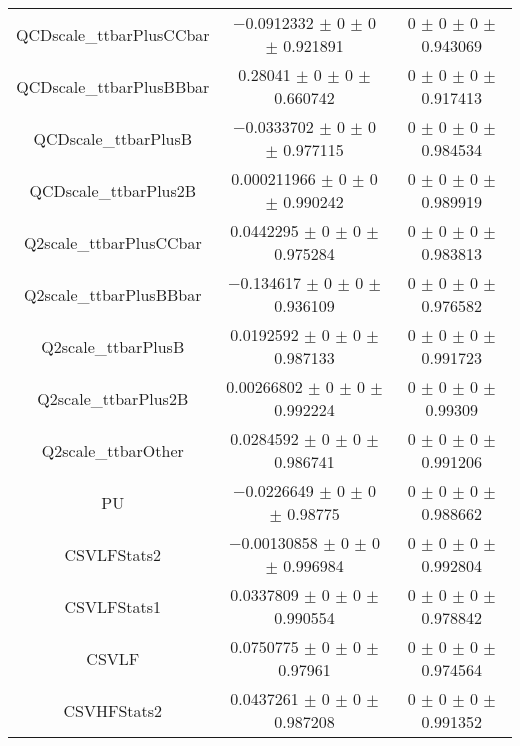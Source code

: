 \begin{table}
\begin{tabular}{ccc}
QCDscale\_ttbarPlusCCbar 	& \num{-0.0912332} $\pm$ \num{0} $\pm$ \num{0} $\pm$ \num{0.921891} 	& \num{0} $\pm$ \num{0} $\pm$ \num{0} $\pm$ \num{0.943069}\\
QCDscale\_ttbarPlusBBbar 	& \num{0.28041} $\pm$ \num{0} $\pm$ \num{0} $\pm$ \num{0.660742} 	& \num{0} $\pm$ \num{0} $\pm$ \num{0} $\pm$ \num{0.917413}\\
QCDscale\_ttbarPlusB 	& \num{-0.0333702} $\pm$ \num{0} $\pm$ \num{0} $\pm$ \num{0.977115} 	& \num{0} $\pm$ \num{0} $\pm$ \num{0} $\pm$ \num{0.984534}\\
QCDscale\_ttbarPlus2B 	& \num{0.000211966} $\pm$ \num{0} $\pm$ \num{0} $\pm$ \num{0.990242} 	& \num{0} $\pm$ \num{0} $\pm$ \num{0} $\pm$ \num{0.989919}\\
Q2scale\_ttbarPlusCCbar 	& \num{0.0442295} $\pm$ \num{0} $\pm$ \num{0} $\pm$ \num{0.975284} 	& \num{0} $\pm$ \num{0} $\pm$ \num{0} $\pm$ \num{0.983813}\\
Q2scale\_ttbarPlusBBbar 	& \num{-0.134617} $\pm$ \num{0} $\pm$ \num{0} $\pm$ \num{0.936109} 	& \num{0} $\pm$ \num{0} $\pm$ \num{0} $\pm$ \num{0.976582}\\
Q2scale\_ttbarPlusB 	& \num{0.0192592} $\pm$ \num{0} $\pm$ \num{0} $\pm$ \num{0.987133} 	& \num{0} $\pm$ \num{0} $\pm$ \num{0} $\pm$ \num{0.991723}\\
Q2scale\_ttbarPlus2B 	& \num{0.00266802} $\pm$ \num{0} $\pm$ \num{0} $\pm$ \num{0.992224} 	& \num{0} $\pm$ \num{0} $\pm$ \num{0} $\pm$ \num{0.99309}\\
Q2scale\_ttbarOther 	& \num{0.0284592} $\pm$ \num{0} $\pm$ \num{0} $\pm$ \num{0.986741} 	& \num{0} $\pm$ \num{0} $\pm$ \num{0} $\pm$ \num{0.991206}\\
PU 	& \num{-0.0226649} $\pm$ \num{0} $\pm$ \num{0} $\pm$ \num{0.98775} 	& \num{0} $\pm$ \num{0} $\pm$ \num{0} $\pm$ \num{0.988662}\\
CSVLFStats2 	& \num{-0.00130858} $\pm$ \num{0} $\pm$ \num{0} $\pm$ \num{0.996984} 	& \num{0} $\pm$ \num{0} $\pm$ \num{0} $\pm$ \num{0.992804}\\
CSVLFStats1 	& \num{0.0337809} $\pm$ \num{0} $\pm$ \num{0} $\pm$ \num{0.990554} 	& \num{0} $\pm$ \num{0} $\pm$ \num{0} $\pm$ \num{0.978842}\\
CSVLF 	& \num{0.0750775} $\pm$ \num{0} $\pm$ \num{0} $\pm$ \num{0.97961} 	& \num{0} $\pm$ \num{0} $\pm$ \num{0} $\pm$ \num{0.974564}\\
CSVHFStats2 	& \num{0.0437261} $\pm$ \num{0} $\pm$ \num{0} $\pm$ \num{0.987208} 	& \num{0} $\pm$ \num{0} $\pm$ \num{0} $\pm$ \num{0.991352}\\

\end{tabular}
\end{table}
